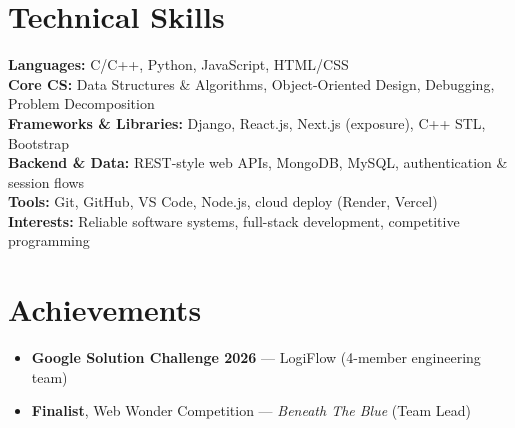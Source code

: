 \documentclass[a4paper,10pt]{article}
\begin{document}
\section{Technical Skills}
\noindent\small
\textbf{Languages:} C/C++, Python, JavaScript, HTML/CSS \\[0.35mm]
\textbf{Core CS:} Data Structures \& Algorithms, Object-Oriented Design, Debugging, Problem Decomposition \\[0.35mm]
\textbf{Frameworks \& Libraries:} Django, React.js, Next.js (exposure), C++ STL, Bootstrap \\[0.35mm]
\textbf{Backend \& Data:} REST-style web APIs, MongoDB, MySQL, authentication \& session flows \\[0.35mm]
\textbf{Tools:} Git, GitHub, VS Code, Node.js, cloud deploy (Render, Vercel) \\[0.35mm]
\textbf{Interests:} Reliable software systems, full-stack development, competitive programming

\section{Achievements}
\begin{itemize}
  \item \textbf{Google Solution Challenge 2026} --- LogiFlow (4-member engineering team)
  \item \textbf{Finalist}, Web Wonder Competition --- \textit{Beneath The Blue} (Team Lead)
\end{itemize}
\end{document}
